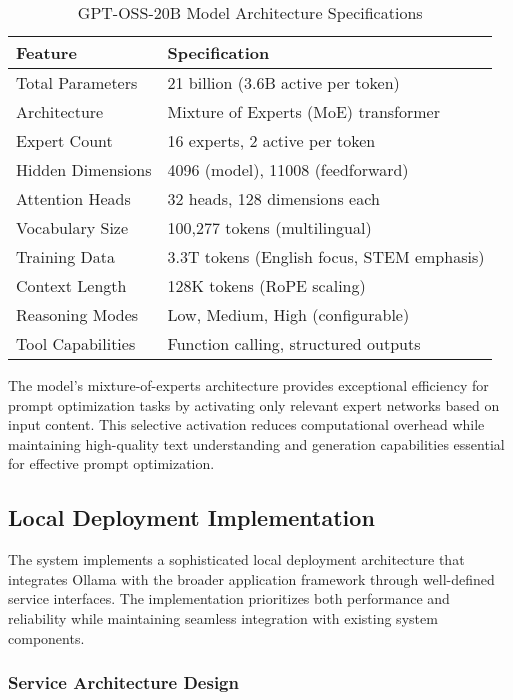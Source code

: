 \begin{table}[H]
\centering
\caption{GPT-OSS-20B Model Architecture Specifications}
\label{tab:gpt_oss_specs}
{\begin{tabular}{ll}
\toprule
\textbf{Feature} & \textbf{Specification} \\
\midrule
Total Parameters & 21 billion (3.6B active per token) \\
Architecture & Mixture of Experts (MoE) transformer \\
Expert Count & 16 experts, 2 active per token \\
Hidden Dimensions & 4096 (model), 11008 (feedforward) \\
Attention Heads & 32 heads, 128 dimensions each \\
Vocabulary Size & 100,277 tokens (multilingual) \\
Training Data & 3.3T tokens (English focus, STEM emphasis) \\
Context Length & 128K tokens (RoPE scaling) \\
Reasoning Modes & Low, Medium, High (configurable) \\
Tool Capabilities & Function calling, structured outputs \\
\bottomrule
\end{tabular}}
\end{table}

The model's mixture-of-experts architecture provides exceptional efficiency for prompt optimization tasks by activating only relevant expert networks based on input content. This selective activation reduces computational overhead while maintaining high-quality text understanding and generation capabilities essential for effective prompt optimization.

\subsection{Local Deployment Implementation}

The system implements a sophisticated local deployment architecture that integrates Ollama with the broader application framework through well-defined service interfaces. The implementation prioritizes both performance and reliability while maintaining seamless integration with existing system components.

\subsubsection{Service Architecture Design}

